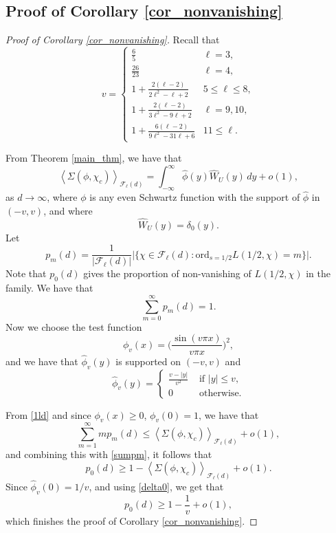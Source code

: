 \documentclass[12pt]{amsart}
\begin{document}
\subsection{Proof of Corollary \ref{cor_nonvanishing}}

\begin{proof}[Proof of Corollary \ref{cor_nonvanishing}]
Recall that
\[v=\begin{cases}\frac{6}{5} & \ell=3,\\
\frac{26}{23} & \ell=4,\\
1+\frac{2(\ell-2)}{2\ell^2-\ell+2} & 5\leq \ell \leq 8,\\
1+\frac{2(\ell-2)}{3\ell^2-9\ell+2} & \ell=9, 10,\\
1 + \frac{6 (\ell - 2)}{9 \ell^2 - 31 \ell + 6} & 11\leq  \ell.\end{cases}
\]

From Theorem \ref{main_thm}, we have that
\begin{equation}
\left\langle\Sigma(\phi,\chi_c)\right\rangle_{\mathcal{F}_\ell(d)} = \int_{-\infty}^{\infty} \widehat{\phi}(y) \widehat{W}_{U}(y) \, dy + o(1),
\label{1ld}
\end{equation}
as $d \to \infty$, where $\phi$ is any even Schwartz function with the support of $\widehat{\phi}$ in $(-v,v)$, and where
\begin{equation}
\widehat{W}_{U}(y) = \delta_0(y).
\label{delta0}
\end{equation}
Let
$$p_{m}(d) = \frac{1}{|\mathcal{F}_{\ell}(d)|} \Big| \Big\{  \chi \in \mathcal{F}_{\ell}(d) : \text{ord}_{s=1/2} L(1/2,\chi) = m\Big\} \Big|.$$
Note that $p_0(d)$ gives the proportion of non-vanishing of $L(1/2,\chi)$ in the family.
We have that
\begin{equation}
\label{sumpm}
\sum_{m=0}^{\infty} p_m(d) =1.
\end{equation}
Now we choose the test function
\begin{equation*}
\phi_{v}(x) = \Big(  \frac{\sin(v \pi x)}{v \pi x}\Big)^2,
\end{equation*} and we have that $\widehat{\phi}_{v}(y)$ is supported on $(-v,v)$ and
$$\widehat{\phi}_{v}(y) =
\begin{cases}
\frac{v-|y|}{v^2} & \mbox{ if } |y| \leq v, \\
0 & \mbox{ otherwise.}
\end{cases}
$$



From \eqref{1ld} and since $\phi_{v}(x) \geq 0$, $\phi_{ v}(0)=1$, we have that
$$\sum_{m=1}^{\infty} m p_m(d) \leq \left\langle\Sigma(\phi,\chi_c)\right\rangle_{\mathcal{F}_\ell(d)}+ o(1), $$ and combining this with \eqref{sumpm}, it follows that
\begin{equation*}
p_0(d) \geq 1 - \left\langle\Sigma(\phi,\chi_c)\right\rangle_{\mathcal{F}_\ell(d)} +o(1).
\end{equation*}
Since $\widehat{\phi}_{v}(0)=1/v$, and using \eqref{delta0}, we get that
$$p_0(d) \geq 1- \frac{1}{v}+o(1),$$
which finishes the proof of Corollary \ref{cor_nonvanishing}.
\end{proof}
\end{document}
